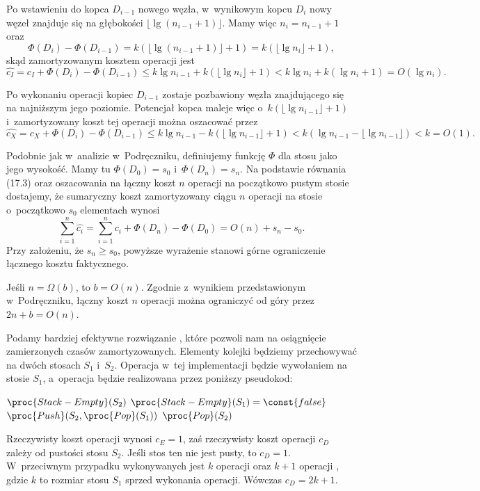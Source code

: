 Po wstawieniu do kopca $D_{i-1}$ nowego węzła, w~wynikowym kopcu $D_i$ nowy węzeł znajduje się na głębokości $\lfloor\lg(n_{i-1}+1)\rfloor$.
Mamy więc $n_i=n_{i-1}+1$ oraz
\[
	\Phi(D_i)-\Phi(D_{i-1}) = k(\lfloor\lg(n_{i-1}+1)\rfloor+1) = k(\lfloor\lg n_i\rfloor+1),
\]
skąd zamortyzowanym kosztem operacji  jest
\[
	\widehat{c_I} = c_I+\Phi(D_i)-\Phi(D_{i-1}) \le k\lg n_{i-1}+k(\lfloor\lg n_i\rfloor+1) < k\lg n_i+k(\lg n_i+1) = O(\lg n_i).
\]

Po wykonaniu operacji  kopiec $D_{i-1}$ zostaje pozbawiony węzła znajdującego się na najniższym jego poziomie.
Potencjał kopca maleje więc o~$k(\lfloor\lg n_{i-1}\rfloor+1)$ i~zamortyzowany koszt tej operacji można oszacować przez
\[
	\widehat{c_X} = c_X+\Phi(D_i)-\Phi(D_{i-1}) \le k\lg n_{i-1}-k(\lfloor\lg n_{i-1}\rfloor+1) < k(\lg n_{i-1}-\lfloor\lg n_{i-1}\rfloor) < k = O(1).
\]

\exercise %
Podobnie jak w~analizie w~Podręczniku, definiujemy funkcję $\Phi$ dla stosu jako jego wysokość.
Mamy tu $\Phi(D_0)=s_0$ i~$\Phi(D_n)=s_n$.
Na podstawie równania (17.3) oraz oszacowania na łączny koszt $n$ operacji na początkowo pustym stosie dostajemy, że sumaryczny koszt zamortyzowany ciągu $n$ operacji na stosie o~początkowo $s_0$ elementach wynosi
\[
	\sum_{i=1}^n\widehat{c_i} = \sum_{i=1}^nc_i+\Phi(D_n)-\Phi(D_0) = O(n)+s_n-s_0.
\]
Przy założeniu, że $s_n\ge s_0$, powyższe wyrażenie stanowi górne ograniczenie łącznego kosztu faktycznego.

\exercise %
Jeśli $n=\Omega(b)$, to $b=O(n)$.
Zgodnie z~wynikiem przedstawionym w~Podręczniku, łączny koszt $n$ operacji  można ograniczyć od góry przez $2n+b=O(n)$.

\exercise %
Podamy bardziej efektywne rozwiązanie , które pozwoli nam na osiągnięcie zamierzonych czasów zamortyzowanych.
Elementy kolejki będziemy przechowywać na dwóch stosach $S_1$ i~$S_2$.
Operacja  w~tej implementacji będzie wywołaniem  na stosie $S_1$, a~operacja  będzie realizowana przez poniższy pseudokod:
\begin{codebox}
\li	\If $\proc{Stack-Empty}(S_2)$
\li		\Then \While $\proc{Stack-Empty}(S_1)=\const{false}$
\li				\Do $\proc{Push}(S_2,\proc{Pop}(S_1))$
				\End
		\End
\li	\Return $\proc{Pop}(S_2)$
\end{codebox}
Rzeczywisty koszt operacji  wynosi $c_E=1$, zaś rzeczywisty koszt operacji  $c_D$ zależy od pustości stosu $S_2$.
Jeśli stos ten nie jest pusty, to $c_D=1$.
W~przeciwnym przypadku wykonywanych jest $k$ operacji  oraz $k+1$ operacji , gdzie $k$ to rozmiar stosu $S_1$ sprzed wykonania operacji.
Wówczas $c_D=2k+1$.

